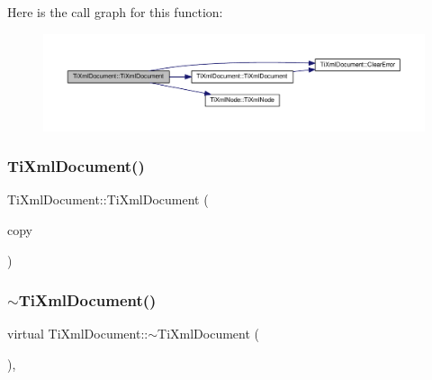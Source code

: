Here is the call graph for this function\+:\nopagebreak
\begin{figure}[H]
\begin{center}
\leavevmode
\includegraphics[width=350pt]{class_ti_xml_document_ae4508b452d0c3061db085f3db27b8396_cgraph}
\end{center}
\end{figure}
\mbox{\label{class_ti_xml_document_a323a7486e7da6099cdc19a5ff7e74b07}} 
\subsubsection{\texorpdfstring{Ti\+Xml\+Document()}{TiXmlDocument()}\hspace{0.1cm}{\footnotesize\ttfamily [3/3]}}
{\footnotesize\ttfamily Ti\+Xml\+Document\+::\+Ti\+Xml\+Document (\begin{DoxyParamCaption}\item[{const \hyperlink{class_ti_xml_document}{Ti\+Xml\+Document} \&}]{copy }\end{DoxyParamCaption})}

\mbox{\label{class_ti_xml_document_a1b8a035c2c2aab38e4387246a0b712c5}} 
\subsubsection{\texorpdfstring{$\sim$\+Ti\+Xml\+Document()}{~TiXmlDocument()}}
{\footnotesize\ttfamily virtual Ti\+Xml\+Document\+::$\sim$\+Ti\+Xml\+Document (\begin{DoxyParamCaption}{ }\end{DoxyParamCaption})\hspace{0.3cm}{\ttfamily [inline]}, {\ttfamily [virtual]}}



